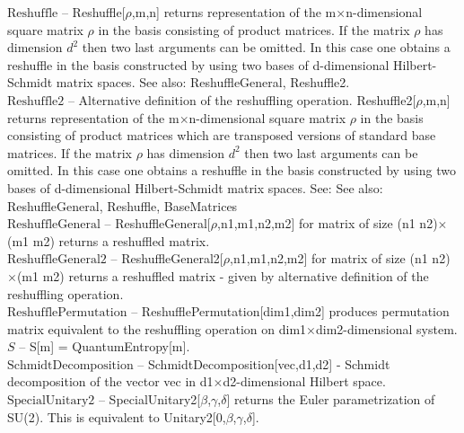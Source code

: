 \documentclass[a4paper,10pt]{scrartcl}
\begin{document}
\textbf{$ \text{Reshuffle} $ }-- Reshuffle[$\rho $,m,n] returns representation of the m$\times $n-dimensional square matrix $\rho $ in the basis consisting of product matrices. If  the matrix $\rho $ has dimension $ d^2 $ then two last arguments can be omitted. In this case one obtains a reshuffle in the basis constructed by using two bases of d-dimensional Hilbert-Schmidt matrix spaces. See also: ReshuffleGeneral, Reshuffle2.$  $\\

\textbf{$ \text{Reshuffle2} $ }-- Alternative definition of the reshuffling operation. Reshuffle2[$\rho $,m,n] returns representation of the m$\times $n-dimensional square matrix $\rho $ in the basis consisting of product matrices which are transposed versions of standard base matrices. If the matrix $\rho $ has dimension $ d^2 $ then two last arguments can be omitted. In this case one obtains a reshuffle in the basis constructed by using two bases of d-dimensional Hilbert-Schmidt matrix spaces. See: See also: ReshuffleGeneral, Reshuffle, BaseMatrices$  $\\

\textbf{$ \text{ReshuffleGeneral} $ }-- ReshuffleGeneral[$\rho $,n1,m1,n2,m2] for matrix of size (n1 n2)$\times $(m1 m2) returns a reshuffled matrix.$  $\\

\textbf{$ \text{ReshuffleGeneral2} $ }-- ReshuffleGeneral2[$\rho $,n1,m1,n2,m2] for matrix of size (n1 n2)$\times $(m1 m2) returns a reshuffled matrix - given by alternative definition of the reshuffling operation.$  $\\

\textbf{$ \text{ReshufflePermutation} $ }-- ReshufflePermutation[dim1,dim2] produces permutation matrix equivalent to the reshuffling operation on dim1$\times $dim2-dimensional system.$  $\\

\textbf{$ S $ }-- S[m] = QuantumEntropy[m].$  $\\

\textbf{$ \text{SchmidtDecomposition} $ }-- SchmidtDecomposition[vec,d1,d2] - Schmidt decomposition of the vector vec in d1$\times $d2-dimensional Hilbert space.$  $\\

\textbf{$ \text{SpecialUnitary2} $ }-- SpecialUnitary2[$\beta $,$\gamma $,$\delta $] returns the Euler parametrization of SU(2). This is equivalent to Unitary2[0,$\beta $,$\gamma $,$\delta $].$  $\\
\end{document}
